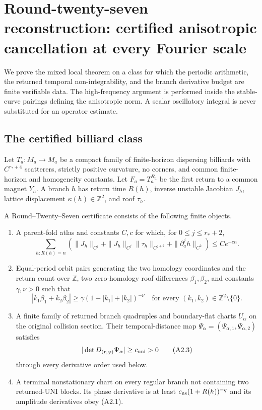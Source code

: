 \section{Round-twenty-seven reconstruction: certified anisotropic cancellation at every Fourier scale}
\label{sec:r27-a2}

We prove the mixed local theorem on a class for which the periodic arithmetic,
the returned temporal non-integrability, and the branch derivative budget are
finite verifiable data.  The high-frequency argument is performed inside the
stable-curve pairings defining the anisotropic norm.  A scalar oscillatory
integral is never substituted for an operator estimate.

\subsection{The certified billiard class}

Let $T_a:M_a\to M_a$ be a compact family of finite-horizon dispersing
billiards with $C^{r_*+4}$ scatterers, strictly positive curvature, no corners,
and common finite-horizon and homogeneity constants.  Let $F_a=T_a^{R_a}$ be
the first return to a common magnet $Y_a$.  A branch $h$ has return time
$R(h)$, inverse unstable Jacobian $J_h$, lattice displacement
$\kappa(h)\in\mathbb Z^2$, and roof $\tau_h$.

A Round--Twenty--Seven certificate consists of the following finite objects.

\begin{enumerate}[label=(C\arabic*)]
\item A parent-fold atlas and constants $C,c$ for which, for
      $0\le j\le r_*+2$,
\[
 \sum_{h:R(h)=n}\left(
 \|J_h\|_{C^j}
 +\|J_h\|_{C^j}\|\tau_h\|_{C^{j+2}}
 +\|\partial_a^jh\|_{C^2}\right)\le Ce^{-cn}.             \tag{A2.1}
\]
\item Equal-period orbit pairs generating the two homology coordinates and
      the return count over $\mathbb Z$, two zero-homology roof differences
      $\beta_1,\beta_2$, and constants $\gamma,\nu>0$ such that
\[
 |k_1\beta_1+k_2\beta_2|
 \ge\gamma(1+|k_1|+|k_2|)^{-\nu}
 \quad\text{for every }(k_1,k_2)\in\mathbb Z^2\setminus\{0\}.             \tag{A2.2}
\]
\item A finite family of returned branch quadruples and boundary-flat charts
      $U_\alpha$ on the original collision section.  Their temporal-distance
      map $\Psi_\alpha=(\Psi_{\alpha,1},\Psi_{\alpha,2})$ satisfies
\[
 |\det D_{(r,\varphi)}\Psi_\alpha|\ge c_{\rm uni}>0        \tag{A2.3}
\]
      through every derivative order used below.
\item A terminal nonstationary chart on every regular branch not containing
      two returned-UNI blocks.  Its phase derivative is at least
      $c_{\rm ns}(1+R(h))^{-q}$ and its amplitude derivatives obey (A2.1).
\end{enumerate}


